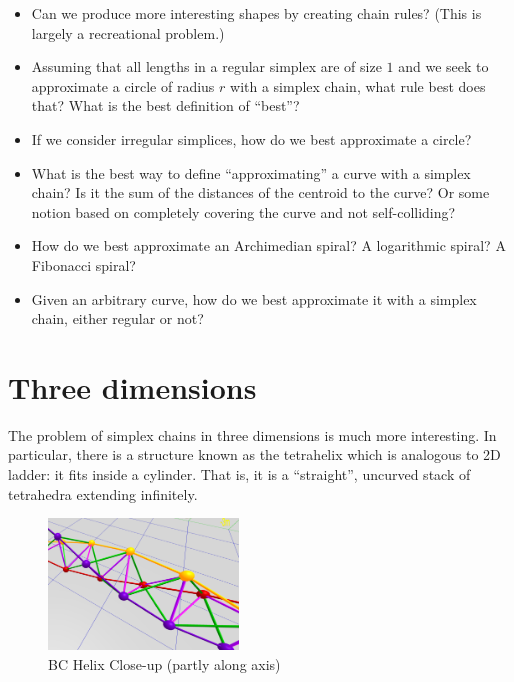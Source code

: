 \documentclass[11pt]{article}
\begin{document}
\begin{itemize}
\item Can we produce more interesting shapes by creating chain rules? (This is largely a recreational problem.)
\item Assuming that all lengths in a regular simplex are of size $1$ and we seek to approximate a circle of radius $r$ with a simplex chain,
  what rule best does that?  What is the best definition of ``best''?
\item If we consider irregular simplices, how do we best approximate a circle?
\item What is the best way to define ``approximating'' a curve with a simplex chain? Is it the sum of the distances of the centroid to the curve?
  Or some notion based on completely covering the curve and not self-colliding?
\item How do we best approximate an Archimedian spiral? A logarithmic spiral? A Fibonacci spiral?
  \item Given an arbitrary curve, how do we best approximate it with a simplex chain, either regular or not?
\end{itemize}

\section{Three dimensions}

The problem of simplex chains in three dimensions is much more interesting. In particular, there is a structure known as the
tetrahelix which is analogous to 2D ladder: it fits inside a cylinder. That is, it is a ``straight'', uncurved stack
of tetrahedra extending infinitely.



\begin{figure}
  \centering
     \includegraphics[width=0.45\textwidth]{figures/BCHelixCloseUp.png}
     \caption{BC Helix Close-up (partly along axis)}
  \label{fig:closeup}     
\end{figure}
\end{document}
